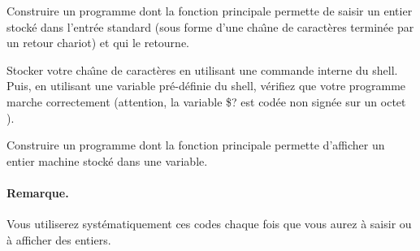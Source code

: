 \begin{exercice} 
Construire un programme dont la fonction principale permette de saisir
un entier stock\'e dans l'entr\'ee standard (sous forme d'une
cha\^\i{}ne de caract\`eres termin\'ee par un retour chariot) et qui
le retourne.
\ifcorrection
\begin{correction}

\end{correction}
\fi 
Stocker votre cha\^\i{}ne de caract\`eres en utilisant une commande
interne du shell.  Puis, en utilisant une variable pr\'e-d\'efinie du
shell, v\'erifiez que votre programme marche correctement (attention,
la variable \$? est cod\'ee non sign\'ee sur un octet ).
\end{exercice}

\begin{exercice} 
Construire un programme dont la fonction principale permette d'afficher
un entier machine stock\'e dans une variable.
\ifcorrection
\begin{correction}

\end{correction}
\fi 
\end{exercice}

\paragraph{Remarque.}
Vous utiliserez syst\'ematiquement ces codes chaque fois que vous
aurez \`a saisir ou \`a afficher des entiers.


